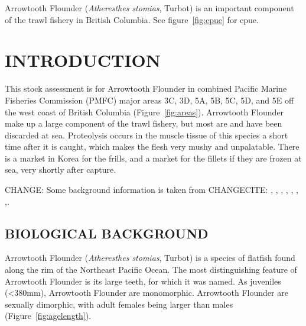 

Arrowtooth Flounder (\emph{Atheresthes stomias}, Turbot) is an important component of the trawl fishery in British Columbia.
See figure~\ref{fig:cpue} for cpue.




\clearpage

\setcounter{page}{1}

\section{INTRODUCTION}

This stock assessment is for Arrowtooth Flounder in combined Pacific Marine Fisheries Commission (PMFC) major areas 3C, 3D, 5A, 5B, 5C, 5D, and 5E off the west coast of British Columbia (Figure~\ref{fig:areas}). Arrowtooth Flounder make up a large component of the trawl fishery, but most are and have been discarded at sea. Proteolysis occurs in the muscle tissue of this species a short time after it is caught, which makes the flesh very mushy and unpalatable. There is a market in Korea for the frills, and a market for the fillets if they are frozen at sea, very shortly after capture.

CHANGE: Some background information is taken from  CHANGECITE: \citet{arf1995}, \citet{arf1999a}, \citet{arf1999b}, \citet{arf2000}, \citet{arf2001}, \citet{arf2003}, \citet{arf2006},\citet{arf2013}.

\subsection{BIOLOGICAL BACKGROUND}

Arrowtooth Flounder (\emph{Atheresthes stomias}, Turbot) is a species of flatfish found along the rim of the Northeast Pacific Ocean. The most distinguishing feature of Arrowtooth Flounder is its large teeth, for which it was named. As juveniles (<380mm), Arrowtooth Flounder are monomorphic. Arrowtooth Flounder are sexually dimorphic, with adult females being larger than males (Figure~\ref{fig:agelength}).

